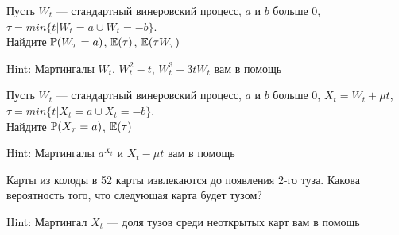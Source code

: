 \begin{problem}
Пусть $W_{t}$ --- стандартный винеровский процесс, $a$ и $b$ больше 0, $\tau=min\{t|W_{t}=a \cup W_{t}=-b\}$. \\
Найдите $\P(W_{\tau}=a)$, $\E(\tau)$, $\E(\tau W_{\tau})$ 
\end{problem} 
\begin{solution} 

Hint: Мартингалы $W_{t}$, $W_{t}^2-t$, $W_{t}^{3}-3tW_{t}$ вам в помощь 
\end{solution}

\begin{problem}
Пусть $W_{t}$ --- стандартный винеровский процесс, $a$ и $b$ больше 0, $X_{t}=W_{t}+\mu t$, $\tau=min\{t|X_{t}=a \cup X_{t}=-b\}$. \\
Найдите $\P(X_{\tau}=a)$, $\E(\tau)$ 
\end{problem} 
\begin{solution} 

Hint: Мартингалы $a^{X_{t}}$ и $X_{t}-\mu t$ вам в помощь 
\end{solution}

\begin{problem}
Карты из колоды в 52 карты извлекаются до появления 2-го туза. Какова вероятность того, что следующая карта будет тузом? 
\end{problem} 
\begin{solution} 

Hint: Мартингал $X_{t}$ --- доля тузов среди неоткрытых карт вам в помощь 
\end{solution}

